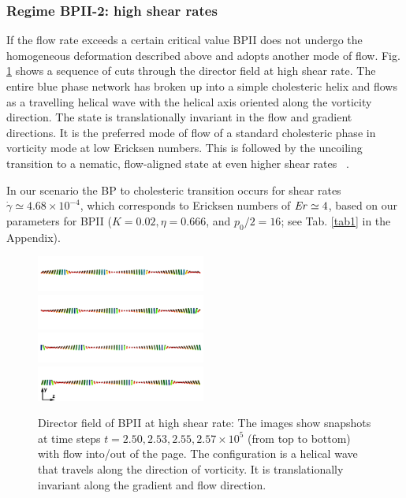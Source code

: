\documentclass[aps,pre,reprint,superscriptaddress, twocolumn]{revtex4}
\newcommand{\e}[1]{\times10^{#1}}
\newcommand{\gd}{\dot{\gamma}}
\begin{document}
\subsubsection{Regime BPII-2: high shear rates}

If the flow rate exceeds a certain critical value BPII does not undergo the 
homogeneous deformation described above and adopts another mode of flow. 
Fig. \ref{bp2-high} shows a sequence of cuts through the director 
field at high shear rate. The entire blue phase network has broken up 
into a simple cholesteric helix and flows as a travelling 
helical wave with the helical axis oriented along the vorticity direction.
The state is translationally invariant in the flow and gradient directions.
It is the preferred mode of flow of a standard cholesteric phase
in vorticity mode at low Ericksen numbers. This is followed by
the uncoiling transition to a nematic, flow-aligned state at even 
higher shear rates ~\cite{Rey:1996a, Rey:1996b}.

In our scenario the BP to cholesteric transition occurs for shear rates $\gd\simeq 4.68\e{-4}$, which
corresponds to Ericksen numbers of ${\it Er}\simeq4$, based on our
parameters for BPII ($K=0.02, \eta=0.666$, and $p_0/2=16$;
see Tab. \ref{tab1} in the Appendix).

\begin{figure}[htpb]
\includegraphics[width=0.495\textwidth]{dir+y-250k_run949.png}
\includegraphics[width=0.495\textwidth]{dir+y-253k_run949.png}
\includegraphics[width=0.495\textwidth]{dir+y-255k_run949.png}
\includegraphics[width=0.495\textwidth]{dir+y-257k_run949.png}
\caption{Director field of BPII at high shear rate: The images show snapshots at time steps 
$t=2.50, 2.53,2.55, 2.57\e{5}$ (from top to bottom) with flow into/out of the page. 
The configuration is a helical wave that travels along the direction of vorticity.
It is translationally invariant along the gradient and flow direction.}
\label{bp2-high}
\end{figure}
\end{document}
